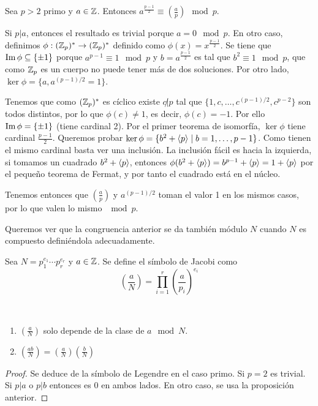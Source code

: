 \documentclass[CR.tex]{subfiles}
\begin{document}
\begin{prop}[Euler]
Sea $p>2$ primo y $a\in\mathbb{Z}$. Entonces $a^{\frac{p-1}{2}}\equiv (\frac{a}{p}) \mod p$.
\end{prop}
\begin{dem}
Si $p|a$, entonces el resultado es trivial porque $a=0\mod p$. En otro caso, definimos $\phi:(\mathbb{Z}_p)^*\to (\mathbb{Z}_p)^*$ definido como $\phi(x)=x^{\frac{p-1}{2}}$. Se tiene que $\operatorname{Im}\phi\subseteq \{\pm 1\}$ porque $a^{p-1}\equiv 1\mod p$ y $b=a^{\frac{p-1}{2}}$ es tal que $b^2\equiv 1\mod p$, que como $\mathbb{Z}_p$ es un cuerpo no puede tener más de dos soluciones. Por otro lado, $\ker\phi=\{a, a^{(p-1)/2}=1\}$. 

Tenemos que como $(\mathbb{Z}_p)^*$ es cíclico existe $c\not| p$ tal que $\{1,c,\dots, c^{(p-1)/2}, c^{p-2}\}$ son todos distintos, por lo que $\phi(c)\neq 1$, es decir, $\phi(c)=-1$. Por ello $\operatorname{Im}\phi=\{\pm 1\}$ (tiene cardinal 2). Por el primer teorema de isomorfía, $\ker\phi$ tiene cardinal $\frac{p-1}{2}$.  Queremos probar $\ker\phi=\{b^2+\langle{p}\rangle\mid b=1,\dots, p-1\}$. Como tienen el mismo cardinal basta ver una inclusión. La inclusión fácil es hacia la izquierda, si tomamos un cuadrado $b^2+\langle{p}\rangle$, entonces $\phi(b^2+\langle{p}\rangle)=b^{p-1}+\langle{p}\rangle=1+\langle{p}\rangle$ por el pequeño teorema de Fermat, y por tanto el cuadrado está en el núcleo. 

Tenemos entonces que $(\frac{a}{p})$ y $a^{(p-1)/2}$ toman el valor 1 en los mismos casos, por lo que valen lo mismo $\mod p$. 
\end{dem}

Queremos ver que la congruencia anterior se da también módulo $N$ cuando $N$ es compuesto definiéndola adecuadamente. 

\begin{defi}
Sea $N=p_1^{e_1}\cdots p_r^{e_r}$ y $a\in\mathbb{Z}$. Se define el símbolo de Jacobi como 
\[
\left(\frac{a}{N}\right)=\prod_{i=1}^r \left(\frac{a}{p_i}\right)^{e_i}
\]
\end{defi}

\begin{lemma}\
\begin{enumerate}
\item $(\frac{a}{N})$ solo depende de la clase de $a\mod N$.
\item $(\frac{ab}{N})=(\frac{a}{N})(\frac{b}{N})$
\end{enumerate}
\end{lemma}
\begin{proof}
Se deduce de la símbolo de Legendre en el caso primo. Si $p=2$ es trivial. Si $p|a$ o $p|b$ entonces es 0 en ambos lados. En otro caso, se usa la proposición anterior.
\end{proof}
\end{document}
